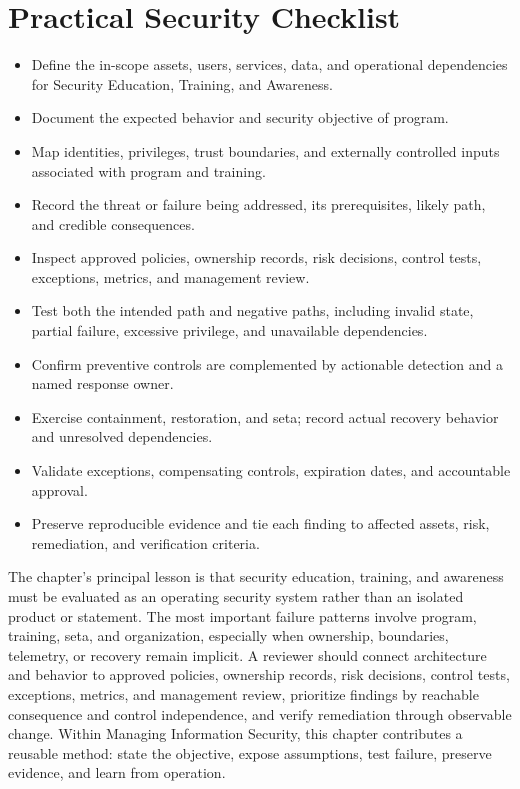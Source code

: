 \documentclass[11pt]{article}
\begin{document}
\section*{Practical Security Checklist}
\begin{itemize}[label=$\square$]
\item Define the in-scope assets, users, services, data, and operational dependencies for Security Education, Training, and Awareness.
\item Document the expected behavior and security objective of program.
\item Map identities, privileges, trust boundaries, and externally controlled inputs associated with program and training.
\item Record the threat or failure being addressed, its prerequisites, likely path, and credible consequences.
\item Inspect approved policies, ownership records, risk decisions, control tests, exceptions, metrics, and management review.
\item Test both the intended path and negative paths, including invalid state, partial failure, excessive privilege, and unavailable dependencies.
\item Confirm preventive controls are complemented by actionable detection and a named response owner.
\item Exercise containment, restoration, and seta; record actual recovery behavior and unresolved dependencies.
\item Validate exceptions, compensating controls, expiration dates, and accountable approval.
\item Preserve reproducible evidence and tie each finding to affected assets, risk, remediation, and verification criteria.
\end{itemize}
\begin{synthesisbox}
The chapter's principal lesson is that security education, training, and awareness must be evaluated as an operating security system rather than an isolated product or statement. The most important failure patterns involve program, training, seta, and organization, especially when ownership, boundaries, telemetry, or recovery remain implicit. A reviewer should connect architecture and behavior to approved policies, ownership records, risk decisions, control tests, exceptions, metrics, and management review, prioritize findings by reachable consequence and control independence, and verify remediation through observable change. Within Managing Information Security, this chapter contributes a reusable method: state the objective, expose assumptions, test failure, preserve evidence, and learn from operation.
\end{synthesisbox}
\end{document}
